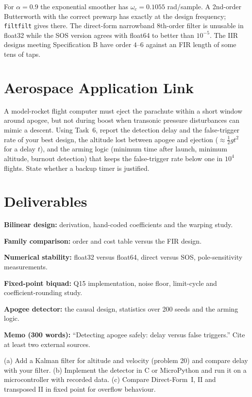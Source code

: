 \documentclass[11pt,a4paper]{article}
\begin{document}
\begin{checkpoint}
For $\alpha=0.9$ the exponential smoother has $\omega_c=0.1055$ rad/sample. A 2nd-order Butterworth with the correct prewarp has exactly  at the design frequency; \texttt{filtfilt} gives  there. The direct-form narrowband 8th-order filter is unusable in float32 while the SOS version agrees with float64 to better than $10^{-5}$. The IIR designs meeting Specification B have order $4$--$6$ against an FIR length of some tens of taps.
\end{checkpoint}

\section*{Aerospace Application Link}
A model-rocket flight computer must eject the parachute within a short window around apogee, but not during boost when transonic pressure disturbances can mimic a descent. Using Task~6, report the detection delay and the false-trigger rate of your best design, the altitude lost between apogee and ejection ($\approx\tfrac12gt^2$ for a delay $t$), and the arming logic (minimum time after launch, minimum altitude, burnout detection) that keeps the false-trigger rate below one in $10^4$ flights. State whether a backup timer is justified.

\section*{Deliverables}
\begin{delivs}
  \item[D1] \textbf{Bilinear design:} derivation, hand-coded coefficients and the warping study.
  \item[D2] \textbf{Family comparison:} order and cost table versus the FIR design.
  \item[D3] \textbf{Numerical stability:} float32 versus float64, direct versus SOS, pole-sensitivity measurements.
  \item[D4] \textbf{Fixed-point biquad:} Q15 implementation, noise floor, limit-cycle and coefficient-rounding study.
  \item[D5] \textbf{Apogee detector:} the causal design, statistics over 200 seeds and the arming logic.
  \item[D6] \textbf{Memo (300 words):} ``Detecting apogee safely: delay versus false triggers.'' Cite at least two external sources.
  \item[Bonus] (a) Add a Kalman filter for altitude and velocity (problem 20) and compare delay with your filter. (b) Implement the detector in C or MicroPython and run it on a microcontroller with recorded data. (c) Compare Direct-Form~I, II and transposed II in fixed point for overflow behaviour.
\end{delivs}
\end{document}
